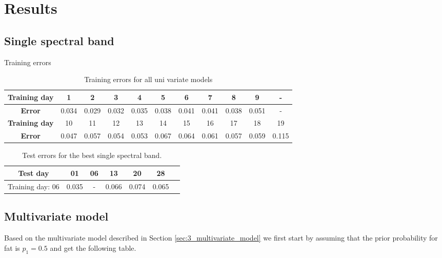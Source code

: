 \documentclass{article}
\begin{document}
\section{Results}
\subsection{Single spectral band}
Training errors \\
\begin{table}[H]
\begin{tabular}{|c|c|c|c|c|c|c|c|c|c|c|}
\hline
\textbf{Training day} & 1 & 2 & 3 & 4 & 5 & 6 & 7 & 8 & 9 & -\\
\hline
\textbf{Error} & 0.034 & 0.029 & 0.032 & 0.035 & 0.038 & 0.041 & 0.041 & 0.038 & 0.051 & -\\
\hline
\textbf{Training day} & 10 & 11 & 12 & 13 & 14 & 15 & 16 & 17 & 18 & 19 \\
\hline
\textbf{Error} & 0.047 & 0.057 & 0.054 & 0.053 & 0.067 & 0.064 & 0.061 & 0.057 & 0.059 & 0.115 \\
\hline
\end{tabular}
\caption{Training errors for all uni variate models}
\label{tab:univariate-errors}
\end{table}
\begin{table}[H]
\begin{tabular}{|c|c|c|c|c|c|c}
\hline
Test day & 01 & 06 & 13 & 20 & 28 \\
\hline 
Training day: 06 & 0.035 & - & 0.066 &0.074 & 0.065 \\
\hline
\end{tabular}
\caption{Test errors for the best single spectral band.}
\label{tab:univariate-errors-day6}
\end{table}
\subsection{Multivariate model}
Based on the multivariate model described in Section \ref{sec:3_multivariate_model} we first start by assuming that the prior probability for fat is $p_1 = 0.5$ and get the following table.
\end{document}
